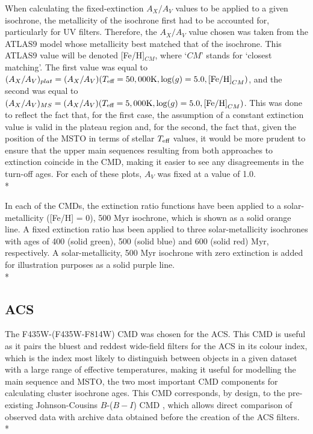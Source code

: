 \documentclass[12pt, a4paper]{report}
\begin{document}
When calculating the fixed-extinction $A_{X}/A_{V}$ values to be applied to a given isochrone, the metallicity of the isochrone first had to be accounted for, particularly for UV filters. Therefore, the $A_{X}/A_{V}$ value chosen was taken from the ATLAS9 model whose metallicity best matched that of the isochrone. This ATLAS9 value will be denoted [Fe/H]$_{CM}$, where `$CM$' stands for `closest matching'. The first value was equal to $(A_{X}/A_{V})_{plat} = (A_{X}/A_{V})(T_{\textnormal{eff}} = 50,000\textnormal{K},\log(g) = 5.0,\textnormal{[Fe/H]}_{CM})$, and the second was equal to $(A_{X}/A_{V})_{MS} = (A_{X}/A_{V})(T_{\textnormal{eff}} = 5,000\textnormal{K},\log(g) = 5.0,\textnormal{[Fe/H]}_{CM})$. This was done to reflect the fact that, for the first case, the assumption of a constant extinction value is valid in the plateau region and, for the second, the fact that, given the position of the MSTO in terms of stellar $T_{\textnormal{eff}}$ values, it would be more prudent to ensure that the upper main sequences resulting from both approaches to extinction coincide in the CMD, making it easier to see any disagreements in the turn-off ages. For each of these plots, $A_{V}$ was fixed at a value of 1.0.\\*

In each of the CMDs, the extinction ratio functions have been applied to a solar-metallicity ([Fe/H] = 0), 500 Myr isochrone, which is shown as a solid orange line. A fixed extinction ratio has been applied to three solar-metallicity isochrones with ages of 400 (solid green), 500 (solid blue) and 600 (solid red) Myr, respectively. A solar-metallicity, 500 Myr isochrone with zero extinction is added for illustration purposes as a solid purple line.\\*

\subsection{ACS} \label{ACS_isoc}
The F435W-(F435W-F814W) CMD was chosen for the ACS. This CMD is useful as it pairs the bluest and reddest wide-field filters for the ACS in its colour index, which is the index most likely to distinguish between objects in a given dataset with a large range of effective temperatures, making it useful for modelling the main sequence and MSTO, the two most important CMD components for calculating cluster isochrone ages. This CMD corresponds, by design, to the pre-existing Johnson-Cousins $B$-($B-I$) CMD \citep{2005PASP..117.1049S}, which allows direct comparison of observed data with archive data obtained before the creation of the ACS filters.\\*
\end{document}
